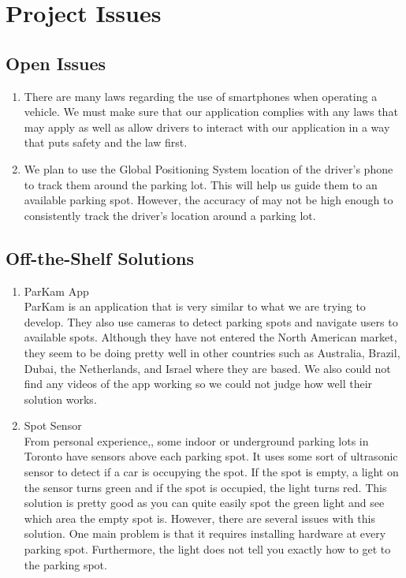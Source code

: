 \documentclass[12pt,letterpaper]{article}
\newcommand{\term}[2][]{\ifthenelse{\equal{#1}{}}{\hyperref[Term:#2]{\textbf{#2}}}{\hyperref[Term:#1]{\textbf{#2}}}}
\begin{document}
\newpage
\section{Project Issues}
\subsection{Open Issues}
\begin{enumerate}
    \item There are many laws regarding the use of smartphones when operating a
    vehicle. We must make sure that our application complies with any laws that
    may apply as well as allow drivers to interact with our application in a way
    that puts safety and the law first.
    
    \item We plan to use the Global Positioning System location of the driver's
    phone to track them around the parking lot. This will help us guide them to
    an available parking spot. However, the accuracy of \term{GPS} may not be
    high enough to consistently track the driver's location around a parking
    lot.
\end{enumerate}

\subsection{Off-the-Shelf Solutions}
\begin{enumerate}
    \item ParKam App\\
    ParKam is an application that is very similar to what we are trying to
    develop. They also use cameras to detect parking spots and navigate users to
    available spots. Although they have not entered the North American market,
    they seem to be doing pretty well in other countries such as Australia,
    Brazil, Dubai, the Netherlands, and Israel where they are based. We also
    could not find any videos of the app working so we could not judge how well
    their solution works.
    
    \item Spot Sensor\\
    From personal experience,, some indoor or underground parking lots in Toronto
    have sensors above each parking spot. It uses some sort of ultrasonic sensor
    to detect if a car is occupying the spot. If the spot is empty, a light on
    the sensor turns green and if the spot is occupied, the light turns red.
    This solution is pretty good as you can quite easily spot the green light
    and see which area the empty spot is. However, there are several issues with
    this solution. One main problem is that it requires installing hardware at
    every parking spot. Furthermore, the light does not tell you exactly how to
    get to the parking spot.
\end{enumerate}
\end{document}
